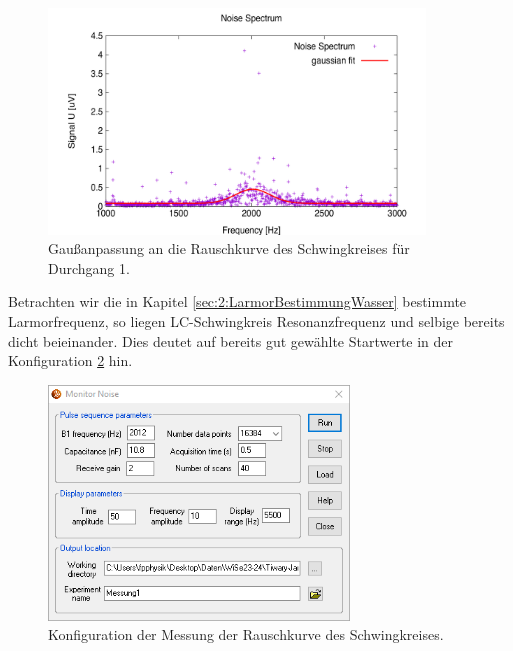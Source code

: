 \documentclass{article}
\begin{document}
    \begin{figure}[h]
        \centering
        \includegraphics[width=10cm]{../Bilddateien/Messung1_Noise_Spectrum_Gaussian.png}
        \caption{Gaußanpassung an die Rauschkurve des Schwingkreises für Durchgang 1.}
        \label{fig:3:GaussFit1}
    \end{figure}
    Betrachten wir die in Kapitel \ref{sec:2:LarmorBestimmungWasser} bestimmte Larmorfrequenz, so liegen LC-Schwingkreis Resonanzfrequenz und selbige bereits dicht beieinander. Dies deutet auf bereits gut gewählte Startwerte in der Konfiguration \ref{fig:3:MonitorNoiseConfig} hin. 
    \begin{figure}[h]
        \centering
        \includegraphics[width=8cm]{../Bilddateien/Sec3_Monitor_Noise_Configuration.png}
        \caption{Konfiguration der Messung der Rauschkurve des Schwingkreises.}
        \label{fig:3:MonitorNoiseConfig}
    \end{figure}

    
\end{document}
